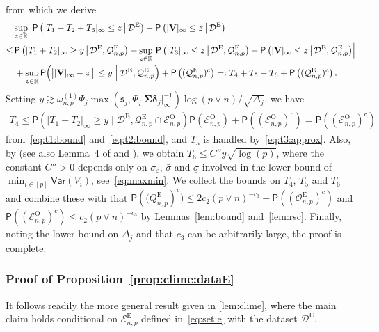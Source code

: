 \documentclass[11pt, a4paper]{article}
\newcommand{\mbf}{\mathbf}
\newcommand{\mc}{\mathcal}
\newcommand{\vep}{\varepsilon}
\renewcommand{\l}{\left}
\renewcommand{\r}{\right}
\newcommand{\Var}[0]{\mathsf{Var}}
\newcommand{\p}{\mathsf{P}}
\newcommand{\R}{\mathbb{R}}
\newcommand{\tE}{\text{E}}
\newcommand{\tO}{\text{O}}
\theoremstyle{definition}
\theoremstyle{definition}
\theoremstyle{definition}
\theoremstyle{definition}
\theoremstyle{definition}
\theoremstyle{remark}
\theoremstyle{definition}
\theoremstyle{definition}
\theoremstyle{definition}
\begin{document}
from which we derive
\begin{align*}
& \sup_{z \in \R} \l\vert \p\l( \vert T_1 + T_2 + T_3 \vert_\infty \le z \,\big\vert\, \mc D^{\tE} \r) - \p\l( \vert \mbf V \vert_\infty \le z \,\big\vert\, \mc D^{\tE} \r) \r\vert 
\\
\le & \, \p\l( \vert T_1 + T_2 \vert_\infty \ge y \,\big\vert\, \mc D^{\tE}, \mc Q^{\tE}_{n, p} \r) + \sup_{z \in \R} \Bigl\vert \p\l( \vert T_3 \vert_\infty \le z \,\big\vert\, \mc D^{\tE}, \mc Q^{\tE}_{n, p} \r) - \p\l( \vert \mbf V \vert_\infty \le z \,\big\vert\, \mc D^{\tE}, \mc Q^{\tE}_{n, p} \r) \Bigr\vert 
\\
& \, + \sup_{z \in \R} \p\Bigl( \bigl\vert \vert \mbf V \vert_\infty - z \,\big\vert\, \le y \Bigm\vert \mc D^{\tE}, \mc Q^{\tE}_{n, p} \Bigr) + \p\l((\mc Q^{\tE}_{n, p})^c\r)
=: T_4 + T_5 + T_6 + \p\l((\mc Q^{\tE}_{n, p})^c\r).
\end{align*}
Setting $y \gtrsim \omega^{(1)}_{n, p} \Psi_j \max(\mathfrak{s}_j, \Psi_j \vert \bm\Sigma \bm\delta_j \vert_\infty^{-1})\log(p \vee n)/\sqrt{\Delta_j}$, we have 
\begin{align*}
T_4 \le \p\l( \vert T_1 + T_2 \vert_\infty \ge y \;\big\vert\; \mc D^{\tE}, \mc Q^{\tE}_{n, p} \cap \mc E^{\tO}_{n, p} \r) \p(\mc E^{\tO}_{n, p}) + \p((\mc E^{\tO}_{n, p})^c) = \p((\mc E^{\tO}_{n, p})^c)
\end{align*}
from~\eqref{eq:t1:bound} and~\eqref{eq:t2:bound}, and $T_5$ is handled by~\eqref{eq:t3:approx}.
Also, by \cite{nazarov2003maximal} (see also Lemma~4 of \citealp{chen2022inference} and \cite{chernozhukov2017detailed}), we obtain $T_6 \le C'' y \sqrt{\log(p)}$, where the constant $C'' > 0$ depends only on $\sigma_\vep$, $\bar{\sigma}$ and $\underline{\sigma}$ involved in the lower bound of $\min_{i \in [p]} \Var(V_i)$, see~\eqref{eq:maxmin}.
We collect the bounds on $T_4$, $T_5$ and $T_6$ and combine these with that $\p(\mc (Q^{\tE}_{n, p})^c) \le 2c_2 (p \vee n)^{-c_3} + \p((\mc O^{\tE}_{n, p})^c)$ and $\p((\mc E^{\tO}_{n, p})^c) \le c_2(p \vee n)^{-c_3}$ by Lemmas~\ref{lem:bound} and~\ref{lem:rsc}. 
Finally, noting the lower bound on $\Delta_j$ and that $c_3$ can be arbitrarily large, the proof is complete. 

\subsubsection{Proof of Proposition~\ref{prop:clime:dataE}}

It follows readily the more general result given in \cref{lem:clime}, where the main claim holds conditional on $\mc E^{\tE}_{n, p}$ defined in~\eqref{eq:set:e} with the dataset $\mc D^{\tE}$.
\end{document}
